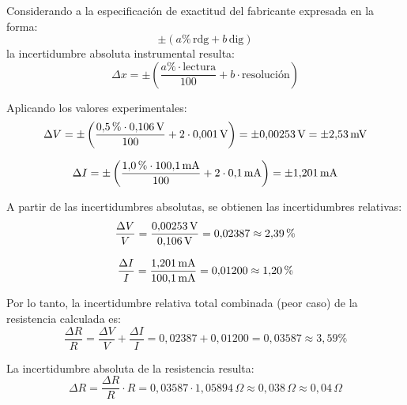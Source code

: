 Considerando a la especificación de exactitud del fabricante expresada en la forma:
\begin{equation}
    \pm\left(a\percent\,\text{rdg} + b\,\text{dig}\right)
    \label{eq:exactitud}
\end{equation}
la incertidumbre absoluta instrumental resulta:
\begin{equation}
    \Delta x = \pm\left(\frac{a\percent \cdot \text{lectura}}{100} + b \cdot \text{resolución}\right)
    \label{eq:calculo_incertidumbre}
\end{equation}

Aplicando los valores experimentales:
\begin{equation}
    \Delta V = \pm\left(\frac{0{,}5\,\% \cdot 0{,}106\,\mathrm{V}}{100} + 2 \cdot 0{,}001\,\mathrm{V}\right) = \pm 0{,}00253\,\mathrm{V} = \pm 2{,}53\,\mathrm{mV}
    \label{eq:incertidumbre_tension}
\end{equation}

\begin{equation}
    \Delta I = \pm\left(\frac{1{,}0\,\% \cdot 100{,}1\,\mathrm{mA}}{100} + 2 \cdot 0{,}1\,\mathrm{mA}\right) = \pm 1{,}201\,\mathrm{mA}
    \label{eq:incertidumbre_corriente}
\end{equation}

A partir de las incertidumbres absolutas, se obtienen las incertidumbres relativas:
\begin{equation}
    \frac{\Delta V}{V} = \frac{0{,}00253\,\mathrm{V}}{0{,}106\,\mathrm{V}} = 0{,}02387 \approx 2{,}39\,\%
    \label{eq:incertidumbre_rel_tension}
\end{equation}

\begin{equation}
    \frac{\Delta I}{I} = \frac{1{,}201\,\mathrm{mA}}{100{,}1\,\mathrm{mA}} = 0{,}01200 \approx 1{,}20\,\%
    \label{eq:incertidumbre_rel_corriente}
\end{equation}

Por lo tanto, la incertidumbre relativa total combinada (peor caso) de la resistencia calculada es:
\begin{equation}
    \frac{\Delta R}{R} = \frac{\Delta V}{V} + \frac{\Delta I}{I} = 0{,}02387 + 0{,}01200 = 0{,}03587 \approx 3{,}59\percent
    \label{eq:incertidumbre_resistencia}
\end{equation}

La incertidumbre absoluta de la resistencia resulta:
\begin{equation}
    \Delta R = \frac{\Delta R}{R} \cdot R = 0{,}03587 \cdot 1{,}05894\,\Omega \approx 0{,}038\,\Omega \approx 0{,}04\,\Omega
    \label{eq:incertidumbre_abs_r}
\end{equation}

